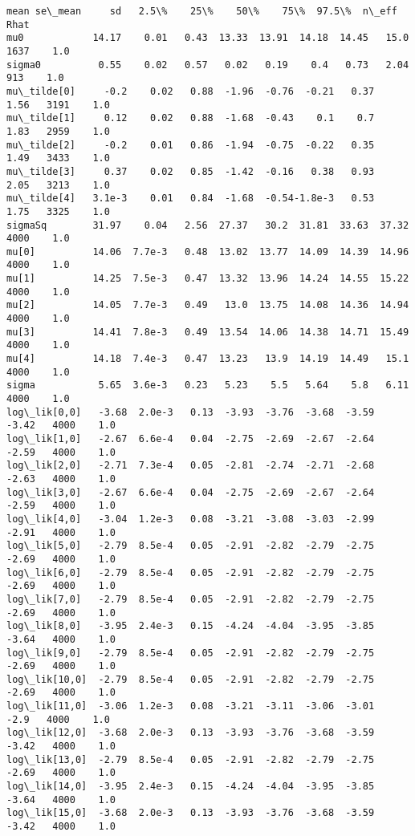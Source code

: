 \documentclass[11pt]{article}
\begin{document}
\begin{Verbatim}[commandchars=\\\{\}]
                mean se\_mean     sd   2.5\%    25\%    50\%    75\%  97.5\%  n\_eff   Rhat
mu0            14.17    0.01   0.43  13.33  13.91  14.18  14.45   15.0   1637    1.0
sigma0          0.55    0.02   0.57   0.02   0.19    0.4   0.73   2.04    913    1.0
mu\_tilde[0]     -0.2    0.02   0.88  -1.96  -0.76  -0.21   0.37   1.56   3191    1.0
mu\_tilde[1]     0.12    0.02   0.88  -1.68  -0.43    0.1    0.7   1.83   2959    1.0
mu\_tilde[2]     -0.2    0.01   0.86  -1.94  -0.75  -0.22   0.35   1.49   3433    1.0
mu\_tilde[3]     0.37    0.02   0.85  -1.42  -0.16   0.38   0.93   2.05   3213    1.0
mu\_tilde[4]   3.1e-3    0.01   0.84  -1.68  -0.54-1.8e-3   0.53   1.75   3325    1.0
sigmaSq        31.97    0.04   2.56  27.37   30.2  31.81  33.63  37.32   4000    1.0
mu[0]          14.06  7.7e-3   0.48  13.02  13.77  14.09  14.39  14.96   4000    1.0
mu[1]          14.25  7.5e-3   0.47  13.32  13.96  14.24  14.55  15.22   4000    1.0
mu[2]          14.05  7.7e-3   0.49   13.0  13.75  14.08  14.36  14.94   4000    1.0
mu[3]          14.41  7.8e-3   0.49  13.54  14.06  14.38  14.71  15.49   4000    1.0
mu[4]          14.18  7.4e-3   0.47  13.23   13.9  14.19  14.49   15.1   4000    1.0
sigma           5.65  3.6e-3   0.23   5.23    5.5   5.64    5.8   6.11   4000    1.0
log\_lik[0,0]   -3.68  2.0e-3   0.13  -3.93  -3.76  -3.68  -3.59  -3.42   4000    1.0
log\_lik[1,0]   -2.67  6.6e-4   0.04  -2.75  -2.69  -2.67  -2.64  -2.59   4000    1.0
log\_lik[2,0]   -2.71  7.3e-4   0.05  -2.81  -2.74  -2.71  -2.68  -2.63   4000    1.0
log\_lik[3,0]   -2.67  6.6e-4   0.04  -2.75  -2.69  -2.67  -2.64  -2.59   4000    1.0
log\_lik[4,0]   -3.04  1.2e-3   0.08  -3.21  -3.08  -3.03  -2.99  -2.91   4000    1.0
log\_lik[5,0]   -2.79  8.5e-4   0.05  -2.91  -2.82  -2.79  -2.75  -2.69   4000    1.0
log\_lik[6,0]   -2.79  8.5e-4   0.05  -2.91  -2.82  -2.79  -2.75  -2.69   4000    1.0
log\_lik[7,0]   -2.79  8.5e-4   0.05  -2.91  -2.82  -2.79  -2.75  -2.69   4000    1.0
log\_lik[8,0]   -3.95  2.4e-3   0.15  -4.24  -4.04  -3.95  -3.85  -3.64   4000    1.0
log\_lik[9,0]   -2.79  8.5e-4   0.05  -2.91  -2.82  -2.79  -2.75  -2.69   4000    1.0
log\_lik[10,0]  -2.79  8.5e-4   0.05  -2.91  -2.82  -2.79  -2.75  -2.69   4000    1.0
log\_lik[11,0]  -3.06  1.2e-3   0.08  -3.21  -3.11  -3.06  -3.01   -2.9   4000    1.0
log\_lik[12,0]  -3.68  2.0e-3   0.13  -3.93  -3.76  -3.68  -3.59  -3.42   4000    1.0
log\_lik[13,0]  -2.79  8.5e-4   0.05  -2.91  -2.82  -2.79  -2.75  -2.69   4000    1.0
log\_lik[14,0]  -3.95  2.4e-3   0.15  -4.24  -4.04  -3.95  -3.85  -3.64   4000    1.0
log\_lik[15,0]  -3.68  2.0e-3   0.13  -3.93  -3.76  -3.68  -3.59  -3.42   4000    1.0

\end{Verbatim}
\end{document}
